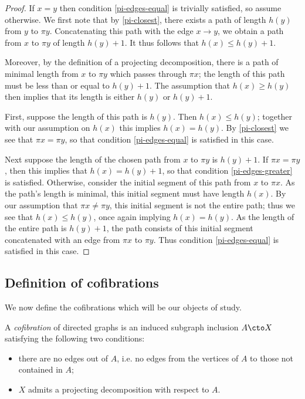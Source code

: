\begin{proof}
If $x = y$ then condition \ref{pi-edges-equal} is trivially satisfied, so assume otherwise. We first note that by \cref{pi-closest}, there exists a path of length $h(y)$ from $y$ to $\pi y$. Concatenating this path with the edge $x \to y$, we obtain a path from $x$ to $\pi y$ of length $h(y) + 1$. It thus follows that $h(x) \leq h(y) + 1$. 

Moreover, by the definition of a projecting decomposition, there is a path of minimal length from $x$ to $\pi y$ which passes through $\pi x$; the length of this path must be less than or equal to $h(y) + 1$. The assumption that $h(x) \geq h(y)$ then implies that its length is either $h(y)$ or $h(y) + 1$.

First, suppose the length of this path is $h(y)$. Then $h(x) \leq h(y)$; together with our assumption on $h(x)$ this implies $h(x) = h(y)$. By \cref{pi-closest} we see that $\pi x = \pi y$, so that condition \ref{pi-edges-equal} is satisfied in this case.

Next suppose the length of the chosen path from $x$ to $\pi y$ is $h(y) + 1$. If $\pi x = \pi y$, then this implies that $h(x) = h(y) + 1$, so that condition \ref{pi-edges-greater} is satisfied. Otherwise, consider the initial segment of this path from $x$ to $\pi x$. As the path's length is minimal, this initial segment must have length $h(x)$. By our assumption that $\pi x \neq \pi y$, this initial segment is not the entire path; thus we see that $h(x) \leq h(y)$, once again implying $h(x) = h(y)$. As the length of the entire path is $h(y) + 1$, the path consists of this initial segment concatenated with an edge from $\pi x$ to $\pi y$. Thus condition \ref{pi-edges-equal} is satisfied in this case.
\end{proof}

\subsection{Definition of cofibrations}

We now define the cofibrations which will be our objects of study.

\begin{defi}\label{cofib-def}
A \emph{cofibration} of directed graphs is an induced subgraph inclusion $A \cto X$ satisfying the following two conditions:
\begin{itemize}
    \item there are no edges out of $A$, i.e.  no edges from the vertices of $A$ to those not contained in $A$;
    \item $X$ admits a projecting decomposition with respect to $A$.
\end{itemize}
\end{defi}

